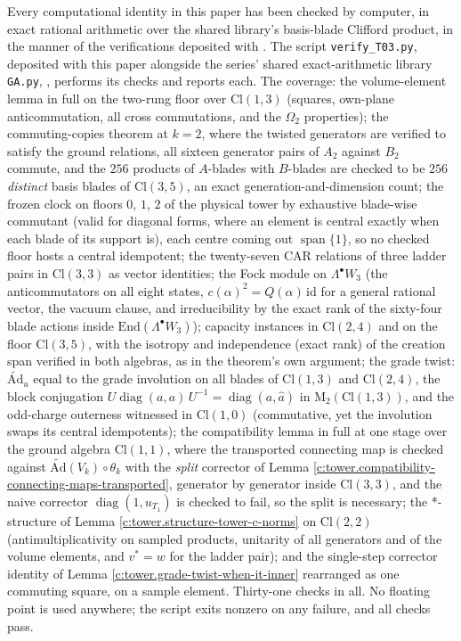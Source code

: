 \documentclass[11pt]{article}
\theoremstyle{definition}
\theoremstyle{plain}
\providecommand{\Ad}{}\renewcommand{\Ad}{\widetilde{\mathrm{Ad}}}
\providecommand{\Cl}{}\renewcommand{\Cl}{\mathrm{Cl}}
\providecommand{\End}{}\renewcommand{\End}{\mathrm{End}}
\providecommand{\Mat}{}\renewcommand{\Mat}{\mathrm{M}}
\begin{document}
\label{c:note.tower.setting-machine-verification}
Every computational identity in this paper has been checked by computer, in exact rational arithmetic over the shared library's basis-blade Clifford product, in the manner of the verifications deposited with \cite{ButlerT1, ButlerT4}. The script \texttt{verify\_T03.py}, deposited with this paper alongside the series' shared exact-arithmetic library \texttt{GA.py}, \cite{ButlerVerifyT03}, performs its checks and reports each. The coverage: the volume-element lemma in full on the two-rung floor over $\Cl(1,3)$ (squares, own-plane anticommutation, all cross commutations, and the $\Omega_2$ properties); the commuting-copies theorem at $k = 2$, where the twisted generators are verified to satisfy the ground relations, all sixteen generator pairs of $A_2$ against $B_2$ commute, and the $256$ products of $A$-blades with $B$-blades are checked to be $256$ \emph{distinct} basis blades of $\Cl(3,5)$, an exact generation-and-dimension count; the frozen clock on floors $0$, $1$, $2$ of the physical tower by exhaustive blade-wise commutant (valid for diagonal forms, where an element is central exactly when each blade of its support is), each centre coming out $\operatorname{span}\{1\}$, so no checked floor hosts a central idempotent; the twenty-seven CAR relations of three ladder pairs in $\Cl(3,3)$ as vector identities; the Fock module on $\Lambda^\bullet W_3$ (the anticommutators on all eight states, $c(\alpha)^2 = Q(\alpha)\,\mathrm{id}$ for a general rational vector, the vacuum clause, and irreducibility by the exact rank of the sixty-four blade actions inside $\End(\Lambda^\bullet W_3)$); capacity instances in $\Cl(2,4)$ and on the floor $\Cl(3,5)$, with the isotropy and independence (exact rank) of the creation span verified in both algebras, as in the theorem's own argument; the grade twist: $\Ad_u$ equal to the grade involution on all blades of $\Cl(1,3)$ and $\Cl(2,4)$, the block conjugation $U \operatorname{diag}(a,a)\,U^{-1} = \operatorname{diag}(a, \hat a)$ in $\Mat_2(\Cl(1,3))$, and the odd-charge outerness witnessed in $\Cl(1,0)$ (commutative, yet the involution swaps its central idempotents); the compatibility lemma in full at one stage over the ground algebra $\Cl(1,1)$, where the transported connecting map is checked against $\Ad(V_k) \circ \theta_k$ with the \emph{split} corrector of Lemma \ref{c:tower.compatibility-connecting-maps-transported}, generator by generator inside $\Cl(3,3)$, and the naive corrector $\operatorname{diag}(1, u_{T_1})$ is checked to fail, so the split is necessary; the *-structure of Lemma \ref{c:tower.structure-tower-c-norms} on $\Cl(2,2)$ (antimultiplicativity on sampled products, unitarity of all generators and of the volume elements, and $v^* = w$ for the ladder pair); and the single-step corrector identity of Lemma \ref{c:tower.grade-twist-when-it-inner} rearranged as one commuting square, on a sample element. Thirty-one checks in all. No floating point is used anywhere; the script exits nonzero on any failure, and all checks pass.
\end{document}
